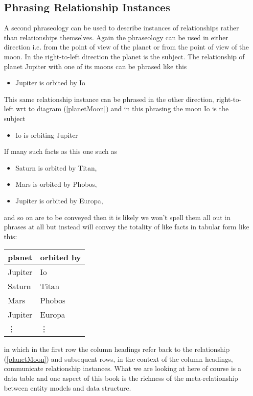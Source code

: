 \subsection*{Phrasing Relationship Instances}
\mynote
A second phraseology can be used to describe instances of relationships rather than relationships themselves. 
Again the phraseology can be used in either direction i.e. from the point of view
of the planet or from the point of view of the moon.
In the right-to-left direction the planet is the subject. The relationship of planet Jupiter with one of its moons can be phrased like this

\begin{itemize}
\renewcommand\labelitemi{--}
\item Jupiter is orbited by Io
\end{itemize}

This same relationship instance can be phrased in the other direction, right-to-left wrt to diagram (\ref{planetMoon}) and in this phrasing the moon Io is the subject

\begin{itemize}
\renewcommand\labelitemi{--}
\item Io is orbiting  Jupiter
\end{itemize}

If many such facts as this one such as
\begin{itemize}
\renewcommand\labelitemi{--} 
\item Saturn is orbited by Titan, 
\item Mars is orbited by Phobos, 
\item Jupiter is orbited by Europa,
\end{itemize}
and so on  are to be conveyed then it is likely we won't spell them all out in phrases at all
but instead  will convey the totality of like facts in tabular form like this:
\begin{center}
\begin{tabular}{|l | l|}
\hline
planet & orbited by \\
\hline\hline
Jupiter  & Io \\
\hline
Saturn   & Titan    \\
\hline
Mars     & Phobos    \\
\hline
Jupiter  & Europa         \\
\hline
\vdots    & \vdots  \\
\hline
\end{tabular}
\end{center}
in which in the first row the column headings refer  back to the relationship (\ref{planetMoon})
and subsequent rows, in the context of the column headings, communicate relationship instances. 
What we are looking at here of course is a data table and one aspect of this book 
is the richness of the meta-relationship between  entity models and data structure.

